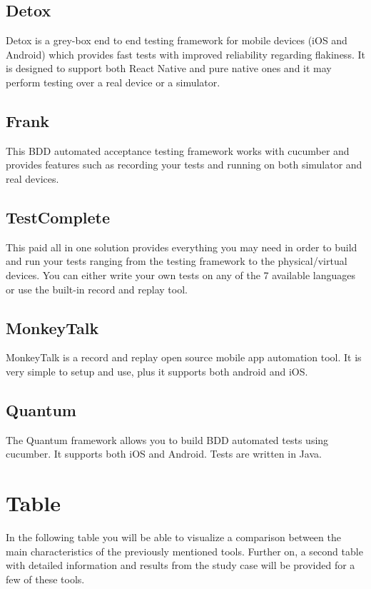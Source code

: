 \subsection {Detox}
Detox is a grey-box end to end testing framework for mobile devices (iOS and Android) which provides fast tests with improved reliability regarding flakiness. It is designed to support both React Native and pure native ones and it may perform testing over a real device or a simulator.

\subsection {Frank}
This BDD automated acceptance testing framework works with cucumber and provides features such as recording your tests and running on both simulator and real devices.

\subsection {TestComplete}
This paid all in one solution provides everything you may need in order to build and run your tests ranging from the testing framework to the physical/virtual devices. You can either write your own tests on any of the 7 available languages or use the built-in record and replay tool.

\subsection {MonkeyTalk}
MonkeyTalk is a record and replay open source mobile app automation tool. It is very simple to setup and use, plus it supports both android and iOS.

\subsection {Quantum}
The Quantum framework allows you to build BDD automated tests using cucumber. It supports both iOS and Android. Tests are written in Java.

\section{Table}
In the following table you will be able to visualize a comparison between the main characteristics of the previously mentioned tools. Further on, a second table with detailed information and results from the study case will be provided for a few of these tools.

